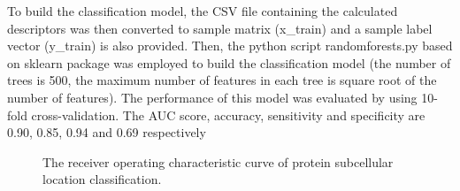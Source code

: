 \documentclass[letterpaper,10pt,english]{sphinxmanual}
\begin{document}
To build the classification model, the CSV file containing the calculated descriptors was then converted to sample matrix (x\_train) and a sample label vector (y\_train) is also provided. Then, the python script randomforests.py based on sklearn package was employed to build the classification model (the number of trees is 500, the maximum number of features in each tree is square root of the number of features). The performance of this model was evaluated by using 10-fold cross-validation. The AUC score, accuracy, sensitivity and specificity are 0.90, 0.85, 0.94 and 0.69 respectively
\begin{figure}[htbp]
\centering
\capstart

\noindent{}
\caption{The receiver operating characteristic curve of protein subcellular location classification.}\label{application:id5}\end{figure}
\end{document}

